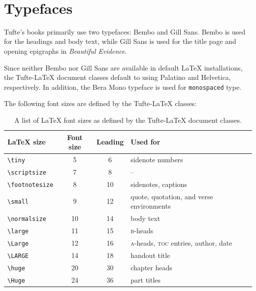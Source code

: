 \documentclass{tufte-book} %
\newcommand{\na}{\quad--} %
\newcommand{\BE}{\textit{Beautiful Evidence}\xspace}
\newcommand{\TL}{Tufte-\LaTeX\xspace}
\begin{document}
\begin{figure}[p]
\hfill
{}
\\\vspace{\baselineskip}
\hfill
{}
\end{figure}


\section{Typefaces}\label{sec:typefaces1}

Tufte's books primarily use two typefaces: Bembo and Gill Sans. Bembo is used for the headings and body text, while Gill Sans is used for the title page and opening epigraphs in \BE.

Since neither Bembo nor Gill Sans are available in default \LaTeX{} installations, the \TL document classes default to using Palatino and Helvetica, respectively. In addition, the Bera Mono typeface is used for \texttt{monospaced} type.

The following font sizes are defined by the \TL classes:

\begin{table}[h]
\footnotesize%
\begin{center}
\begin{tabular}{lccl}
\toprule
\LaTeX{} size & Font size & Leading & Used for \\
\midrule
\verb+\tiny+ & 5 & 6 & sidenote numbers \\
\verb+\scriptsize+ & 7 & 8 & \na \\
\verb+\footnotesize+ & 8 & 10 & sidenotes, captions \\
\verb+\small+ & 9 & 12 & quote, quotation, and verse environments \\
\verb+\normalsize+ & 10 & 14 & body text \\
\verb+\large+ & 11 & 15 & \textsc{b}-heads \\
\verb+\Large+ & 12 & 16 & \textsc{a}-heads, \textsc{toc} entries, author, date \\
\verb+\LARGE+ & 14 & 18 & handout title \\
\verb+\huge+ & 20 & 30 & chapter heads \\
\verb+\Huge+ & 24 & 36 & part titles \\
\bottomrule
\end{tabular}
\end{center}
\caption{A list of \LaTeX{} font sizes as defined by the \TL document classes.}
\label{tab:font-sizes}
\end{table}
\end{document}
